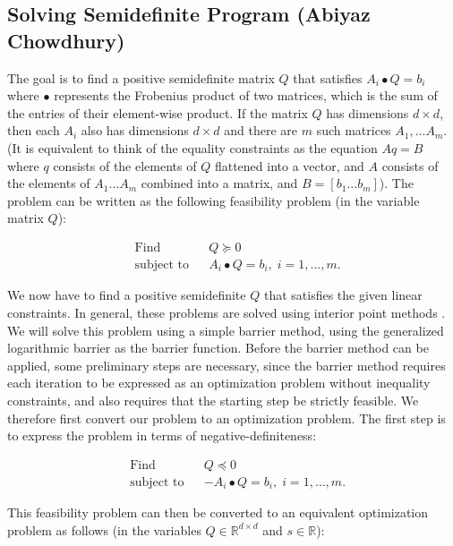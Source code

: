 \documentclass{article}
\begin{document}
\subsection{Solving Semidefinite Program (Abiyaz Chowdhury)}
The goal is to find a positive semidefinite matrix $Q$ that satisfies $A_{i} \bullet Q = b_{i}$ where $\bullet$ represents the Frobenius product of two matrices, which is the sum of the entries of their element-wise product. If the matrix $Q$ has dimensions $d \times d$, then each $A_{i}$ also has dimensions $d \times d$ and there are $m$ such matrices $A_{1},...A_{m}$. (It is equivalent to think of the equality constraints as the equation $Aq = B$ where $q$ consists of the elements of $Q$ flattened into a vector, and $A$ consists of the elements of  $A_{1}...A_{m}$  combined into a matrix, and $B = [b_{1}...b_{m}]$). The problem can be written as the following feasibility problem (in the variable matrix $Q$):

\begin{equation*}
\begin{aligned}
& \text{Find}
& & Q \succeq 0 \\
& \text{subject to}
& & A_i \bullet Q = b_i, \; i = 1, \ldots, m.
\end{aligned}
\end{equation*} 

We now have to find a positive semidefinite $Q$ that satisfies the given linear constraints. In general, these problems are solved using interior point methods \cite{sdp}. We will solve this problem using a simple barrier method, using the generalized logarithmic barrier as the barrier function. Before the barrier method can be applied, some preliminary steps are necessary, since the barrier method requires each iteration to be expressed as an optimization problem without inequality constraints, and also requires that the starting step be strictly feasible. We therefore first convert our problem to an optimization problem. The first step is to express the problem in terms of negative-definiteness:

\begin{equation*}
\begin{aligned}
& \text{Find}
& & Q \preceq 0 \\
& \text{subject to}
& & - A_i \bullet Q = b_i, \; i = 1, \ldots, m.
\end{aligned}
\end{equation*}

This feasibility problem can then be converted to an equivalent optimization problem as follows (in the variables $Q \in \mathbb{R}^{d \times d}$ and $s \in \mathbb{R}$):
\end{document}
